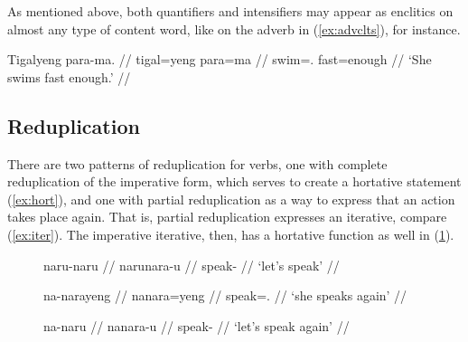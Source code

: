 As mentioned above, both quantifiers and intensifiers may appear as enclitics on almost any type of
content word, like  on the adverb  in (\ref{ex:advclts}),
for instance.

\ex\label{ex:advclts}
\begingl
	\gla Tigalyeng para-ma. //
	\glb tigal=yeng para=ma //
	\glc swim=\TsgF{}.\Aarg{} fast=enough //
	\glft `She swims fast enough.' //
\endgl

% 
% 
\xe


\subsection{Reduplication}
\label{subsec:reduplication}

There are two patterns of reduplication for verbs, one with complete
reduplication of the imperative form, which serves to create a hortative statement
(\ref{ex:hort}), and one with partial reduplication as a way to express that an
action takes place again. That is, partial reduplication expresses an
iterative, compare (\ref{ex:iter}). The imperative iterative, then, has a
hortative function as well in (\ref{ex:hort+iter}).

\begin{figure}
\pex
\a\label{ex:hort}\begingl%
	\gla naru-naru //
	\glb naru\til{}nara-u //
	\glc \Hort{}\til{}speak-\Imp{} //
	\glft `let's speak' //
\endgl

\a\label{ex:iter}\begingl
	\gla na-narayeng //
	\glb na\til{}nara=yeng //
	\glc \Iter{}\til{}speak=\TsgF{}.\Aarg{} //
	\glft `she speaks again' //
\endgl

\a\label{ex:hort+iter}\begingl
	\gla na-naru //
	\glb na\til{}nara-u //
	\glc \Iter{}\til{}speak-\Imp{} //
	\glft `let's speak again' //
\endgl
\xe
\end{figure}

